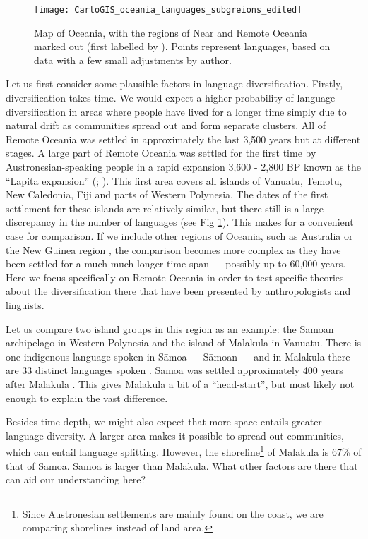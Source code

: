 \documentclass[unnumsec,webpdf,modern,medium]{oup-authoring-template}
\begin{document}
\begin{figure}
\centering
\texttt{[image: CartoGIS\_oceania\_languages\_subgreions\_edited]}
\caption{Map of Oceania, with the regions of Near and Remote Oceania marked out (first labelled by \citet{pawley1973dating}). Points represent languages, based on data \citet{glottolog3} with a few small adjustments by author.} 
\label{RO_overnight_coloured_dots}
\end{figure}

Let us first consider some plausible factors in language diversification. Firstly, diversification takes time. We would expect a higher probability of language diversification in areas where people have lived for a longer time simply due to natural drift as communities spread out and form separate clusters. All of Remote Oceania was settled in approximately the last 3,500 years but at different stages. A large part of Remote Oceania was settled for the first time by Austronesian-speaking people in a rapid expansion 3,600 - 2,800 BP known as the ``Lapita expansion'' (\citet[106-7]{bellwood2006austronesians}; \citet[137]{rieth_cochrane_2018}). This first area covers all islands of Vanuatu, Temotu, New Caledonia, Fiji and parts of Western Polynesia. The dates of the first settlement for these islands are relatively similar, but there still is a large discrepancy in the number of languages (see Fig \ref{RO_overnight_coloured_dots}). This makes for a convenient case for comparison. If we include other regions of Oceania, such as Australia or the New Guinea region \citep{ross2017_new_guinea_region}, the comparison becomes more complex as they have been settled for a much much longer time-span --- possibly up to 60,000 years. Here we focus specifically on Remote Oceania in order to test specific theories about the diversification there that have been presented by anthropologists and linguists.

Let us compare two island groups in this region as an example: the S\={a}moan archipelago in Western Polynesia and the island of Malakula in Vanuatu. There is one indigenous language spoken in S\={a}moa ---  S\={a}moan --- and in Malakula there are 33 distinct languages spoken \citep{glottolog3}. S\={a}moa was settled approximately 400 years after Malakula \citep[137-8]{rieth_cochrane_2018}. This gives Malakula a bit of a ``head-start'', but most likely not enough to explain the vast difference.

Besides time depth, we might also expect that more space entails greater language diversity. A larger area makes it possible to spread out communities, which can entail language splitting. However, the shoreline\footnote{Since Austronesian settlements are mainly found on the coast, we are comparing shorelines instead of land area.} of Malakula is 67\% of that of S\={a}moa. S\={a}moa is larger than Malakula. What other factors are there that can aid our understanding here?
\end{document}
